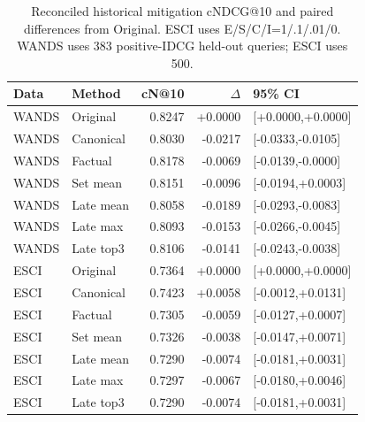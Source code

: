 \begin{table}[htbp]
\caption{Reconciled historical mitigation cNDCG@10 and paired differences from Original. ESCI uses E/S/C/I=1/.1/.01/0. WANDS uses 383 positive-IDCG held-out queries; ESCI uses 500.}\label{tab:legacyrepair}
\centering\small
\begin{tabular}{llrrl}\toprule
Data & Method & cN@10 & $\Delta$ & 95\% CI\\\midrule
WANDS & Original & 0.8247 & +0.0000 & [+0.0000,+0.0000]\\
WANDS & Canonical & 0.8030 & -0.0217 & [-0.0333,-0.0105]\\
WANDS & Factual & 0.8178 & -0.0069 & [-0.0139,-0.0000]\\
WANDS & Set mean & 0.8151 & -0.0096 & [-0.0194,+0.0003]\\
WANDS & Late mean & 0.8058 & -0.0189 & [-0.0293,-0.0083]\\
WANDS & Late max & 0.8093 & -0.0153 & [-0.0266,-0.0045]\\
WANDS & Late top3 & 0.8106 & -0.0141 & [-0.0243,-0.0038]\\
ESCI & Original & 0.7364 & +0.0000 & [+0.0000,+0.0000]\\
ESCI & Canonical & 0.7423 & +0.0058 & [-0.0012,+0.0131]\\
ESCI & Factual & 0.7305 & -0.0059 & [-0.0127,+0.0007]\\
ESCI & Set mean & 0.7326 & -0.0038 & [-0.0147,+0.0071]\\
ESCI & Late mean & 0.7290 & -0.0074 & [-0.0181,+0.0031]\\
ESCI & Late max & 0.7297 & -0.0067 & [-0.0180,+0.0046]\\
ESCI & Late top3 & 0.7290 & -0.0074 & [-0.0181,+0.0031]\\
\bottomrule\end{tabular}
\end{table}
